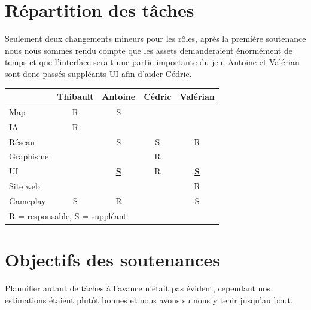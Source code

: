 \documentclass[12pt]{report}
\begin{document}
\section{Répartition des tâches}

Seulement deux changements mineurs pour les rôles, après la première soutenance
nous nous sommes rendu compte que les assets demanderaient énormément de temps
et que l'interface serait une partie importante du jeu, Antoine et Valérian sont
donc passés suppléants UI afin d'aider Cédric.

\vspace{0.5cm}

\begin{center}
    \begin{tabular}{@{} l *4c @{}}
        \toprule
        \multicolumn{1}{c}{}    & \textbf{Thibault}  & \textbf{Antoine}  & \textbf{Cédric} & \textbf{Valérian} \\ 
        \midrule
        Map & R & S & & \\
        IA & R & & & \\
        Réseau & & S & S & R \\
        Graphisme & & & R & \\
        UI & & \underline{\textbf S} & R & \underline{\textbf S} \\
        Site web & & & & R \\
        Gameplay & S & R & & S\\
        \bottomrule
        \multicolumn{4}{l}{\footnotesize R = responsable, S = suppléant}\\
    \end{tabular}
\end{center}

\section{Objectifs des soutenances}

Plannifier autant de tâches à l'avance n'était pas évident, cependant nos
estimations étaient plutôt bonnes et nous avons su nous y tenir jusqu'au bout.
\end{document}
